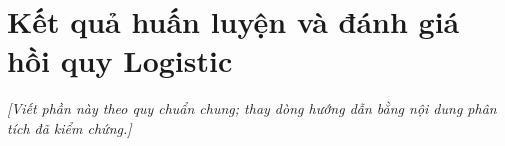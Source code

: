 \section{Kết quả huấn luyện và đánh giá hồi quy Logistic}
\noindent\textit{[Viết phần này theo quy chuẩn chung; thay dòng hướng dẫn bằng nội dung phân tích đã kiểm chứng.]}

